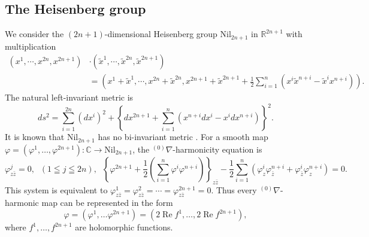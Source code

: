 \documentclass[12pt]{amsart}
\theoremstyle{definition}
\theoremstyle{remark}
\numberwithin{equation}{section}
\begin{document}
\subsection{The Heisenberg group}\label{subsc:Nil}
 We consider the $(2n+1)$-dimensional Heisenberg group 
 $\mathrm{Nil}_{2n+1}$ in $\mathbb{R}^{2n+1}$ with multiplication
\begin{align*}
(x^1,\cdots,x^{2n},x^{2n+1})&\cdot
(\tilde{x}^1,\cdots,\tilde{x}^{2n},\tilde{x}^{2n+1}) \\
&=\left(x^1+\tilde{x}^1,\cdots,x^{2n}+\tilde{x}^{2n},
x^{2n+1}+\tilde{x}^{2n+1}+\frac{1}{2}\sum_{i=1}^{n}
(x^{i}\tilde{x}^{n+i}-\tilde{x}^{i}x^{n+i})\right).
\end{align*}
 The natural left-invariant metric is 
\begin{equation*}
ds^2=\sum_{i=1}^{2n}(dx^i)^2+
 \left\{dx^{2n+1}+\sum_{i=1}^{n}(x^{n+i}dx^i-x^idx^{n+i})
 \right\}^2.
\end{equation*}
 It is known that $\mathrm{Nil}_{2n+1}$
 has no bi-invariant metric \cite{MR}.
 For a smooth map $\varphi=(\varphi^1, \dots, \varphi^{2n+1}):
 \mathbb C \to \mathrm{Nil}_{2n+1}$, the ${{}^{(0)}\nabla}$-harmonicity 
 equation is 
\begin{equation*}
 \varphi^j_{z \bar z} =0,\;\;(1 \leqq j \leqq 2 n), \;\;
 \left\{\varphi^{2n+1}
 +\frac{1}{2}\left(\sum_{i=1}^n\varphi^i\varphi^{n+i}\right)
 \right\}_{z\bar{z}}
 -\frac{1}{2}\sum_{i=1}^n\left(\varphi^i_z\varphi^{n+i}_{\bar z}
 +\varphi^i_{\bar z}\varphi^{n+i}_z\right)=0.
\end{equation*}
 This system is equivalent to 
 $\varphi^1_{z\bar{z}}=\varphi^2_{z\bar{z}}
 =\cdots = \varphi^{2n +1}_{z\bar{z}}=0$.
 Thus every ${{}^{(0)}\nabla}$-harmonic map can be 
 represented in the form
\begin{equation*}
\varphi= (\varphi^1,\dots \varphi^{2n+1}) =
 (2 {\operatorname {Re}} f^1, \dots,2 {\operatorname {Re}} f^{2n+1}),
\end{equation*}
 where $f^1, \dots, f^{2n +1}$ are holomorphic functions.
\end{document}
